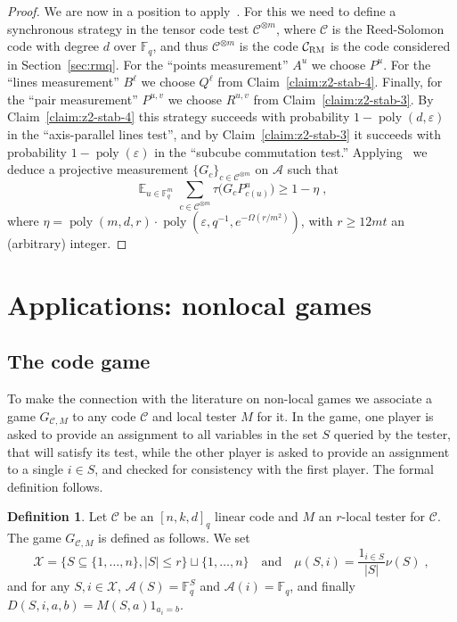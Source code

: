 \documentclass[11pt]{article}
\theoremstyle{definition}
\newtheorem{definition}[theorem]{Definition}
\newcommand{\code}{\mathcal{C}}
\DeclareMathOperator*{\Expectation}{\mathbb{E}}
\newcommand{\Es}[1]{\Expectation_{#1}}
\newcommand{\F}{\ensuremath{\mathbb{F}}}
\newcommand{\mA}{\ensuremath{\mathcal{A}}}
\newcommand{\mX}{\ensuremath{\mathcal{X}}}
\newcommand{\RM}{\ensuremath{\textsc{RM}}}
\DeclareMathOperator{\poly}{poly}
\newcommand{\eps}{\varepsilon}
\begin{document}
\begin{proof}
We are now in a position to apply~\cite[Theorem 4.1]{ji2022quantum}. For this we need to define a synchronous strategy in the tensor code test $\code^{\otimes m}$, where $\code$ is the Reed-Solomon code with degree $d$ over $\F_q$, and thus $\code^{\otimes m}$ is the code $\code_\RM$ is the code considered in Section~\ref{sec:rmq}. For the ``points measurement'' $A^u$ we choose $P^u$. For the ``lines measurement'' $B^\ell$ we choose $Q^\ell$ from Claim~\ref{claim:z2-stab-4}. Finally, for the ``pair measurement'' $P^{u,v}$ we choose $R^{u,v}$ from Claim~\ref{claim:z2-stab-3}. By Claim~\ref{claim:z2-stab-4} this strategy succeeds with probability $1-\poly(d,\eps)$ in the ``axis-parallel lines test'', and by Claim~\ref{claim:z2-stab-3} it succeeds with probability $1-\poly(\eps)$ in the ``subcube commutation test.'' Applying~\cite[Theorem 4.1]{ji2022quantum} we deduce a projective measurement $\{G_c\}_{c\in\code^{\otimes m}}$ on $\mA$ such that
\[ \Es{u\in\F_q^m} \sum_{c\in\code^{\otimes m}} \tau\big( G_c P^u_{c(u)}\big) \geq 1-\eta\;,\]
where $\eta = \poly(m,d,r) \cdot\poly(\eps,q^{-1},e^{-\Omega(r/m^2)})$, with $r\geq 12mt$ an (arbitrary) integer.

\end{proof}








\section{Applications: nonlocal games}
	

\subsection{The code game}

To make the connection with the literature on non-local games we associate a game $G_{\code,M}$ to any code $\code$ and local tester $M$ for it. In the game, one player is asked to provide an assignment to all variables in the set $S$ queried by the tester, that will satisfy its test, while the other player is asked to provide an assignment to a single $i\in S$, and checked for consistency with the first player. The formal definition follows.  

\begin{definition}
Let $\code$ be an $[n,k,d]_q$ linear code and $M$ an $r$-local tester for $\code$. The game $G_{\code,M}$ is defined as follows. We set 
\[\mX = \{ S\subseteq \{1,\ldots,n\},|S|\leq r\} \sqcup\{1,\ldots,n\}\quad\text{and}\quad \mu(S,i)=\frac{1_{i\in S}}{|S|}\nu(S)\;,\]
and for any $S,i\in\mX$, $\mA(S)=\F_q^S$ and $\mA(i)=\F_q$, and finally $D(S,i,a,b)=M(S,a)1_{a_i=b}$. 
\end{definition}
\end{document}

